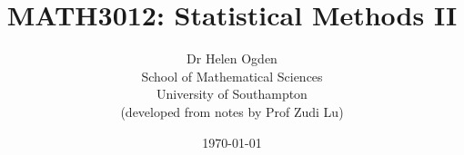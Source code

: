 \title{\huge \bf MATH3012: Statistical Methods II \\}

\author{Dr Helen Ogden \\ School of Mathematical Sciences \\ University of Southampton
\\ \vspace{\baselineskip} (developed from notes by Prof Zudi Lu) \vspace{\baselineskip}}

\date{\today}

\maketitle

\thispagestyle{empty}
